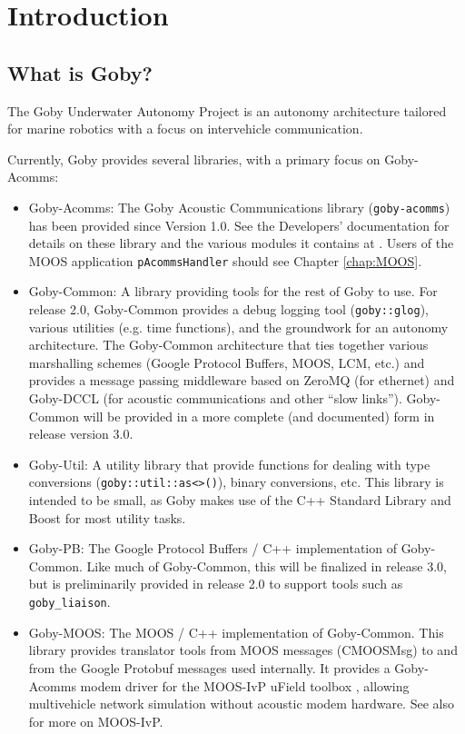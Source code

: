 \MakeShortVerb{\!} %

\chapter{Introduction}

\section{What is Goby?}

The Goby Underwater Autonomy Project is an \gls{autonomy architecture} tailored for marine robotics with a focus on intervehicle communication.

Currently, Goby provides several libraries, with a primary focus on Goby-Acomms:

\begin{itemize}
\item Goby-Acomms: The Goby Acoustic Communications library (\verb|goby-acomms|) has been provided since Version 1.0. See the Developers' documentation for details on these library and the various modules it contains at \cite{goby-doc}. Users of the MOOS application \verb|pAcommsHandler| should see Chapter \ref{chap:MOOS}.
\item Goby-Common: A library providing tools for the rest of Goby to use. For release 2.0, Goby-Common provides a debug logging tool (\verb|goby::glog|), various utilities (e.g. time functions), and the groundwork for an \gls{autonomy architecture}. The Goby-Common architecture that ties together various marshalling schemes (Google Protocol Buffers, MOOS, LCM, etc.) and provides a message passing middleware based on ZeroMQ (for ethernet) and Goby-DCCL (for acoustic communications and other ``slow links''). Goby-Common will be provided in a more complete (and documented) form in release version 3.0.
\item Goby-Util: A utility library that provide functions for dealing with type conversions (\verb|goby::util::as<>()|), binary conversions, etc. This library is intended to be small, as Goby makes use of the C++ Standard Library and Boost for most utility tasks.
\item Goby-PB: The Google Protocol Buffers / C++ implementation of Goby-Common. Like much of Goby-Common, this will be finalized in release 3.0, but is preliminarily provided in release 2.0 to support tools such as \verb|goby_liaison|.
\item Goby-MOOS: The MOOS \cite{moos} / C++ implementation of Goby-Common. This library provides translator tools from MOOS messages (CMOOSMsg) to and from the Google Protobuf messages used internally. It provides a Goby-Acomms modem driver for the MOOS-IvP uField toolbox \cite{ufield}, allowing multivehicle network simulation without acoustic modem hardware. See also \cite{moos-ivp-jfr} for more on MOOS-IvP.
\end{itemize}

